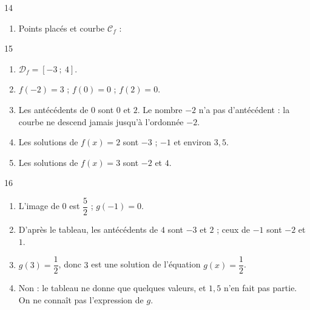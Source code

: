 \documentclass[10pt,a4paper]{article}
\begin{document}
\begin{corr}[Guidé]{14}
\begin{enumerate}[leftmargin=*]
    \(\begin{aligned}[t] f\left(-\dfrac{1}{2}\right)&=\left(-\dfrac{1}{2}\right)^2-2\times\left(-\dfrac{1}{2}\right)-1\\ &=\dfrac{1}{4}+1-1\\ &=\dfrac{1}{4}\end{aligned}\)
    \item Points placés et courbe \(\mathcal{C}_f\) :
    \begin{center}
    \end{center}
\end{enumerate}
\end{corr}

\begin{corr}{15}
\begin{enumerate}[leftmargin=*]
    \item \(\mathcal{D}_f=[-3\ ;\ 4]\).
    \item \(f(-2)=3\) ; \(f(0)=0\) ; \(f(2)=0\).
    \item Les antécédents de \(0\) sont \(0\) et \(2\). Le nombre \(-2\) n'a pas d'antécédent : la courbe ne descend jamais jusqu'à l'ordonnée \(-2\).
    \item Les solutions de \(f(x)=2\) sont \(-3\) ; \(-1\) et environ \(3,5\).
    \item Les solutions de \(f(x)=3\) sont \(-2\) et \(4\).
\end{enumerate}
\end{corr}

\begin{corr}{16}
\begin{enumerate}[leftmargin=*]
    \item L'image de \(0\) est \(\dfrac{5}{2}\) ; \(g(-1)=0\).
    \item D'après le tableau, les antécédents de \(4\) sont \(-3\) et \(2\) ; ceux de \(-1\) sont \(-2\) et \(1\).
    \item \(g(3)=\dfrac{1}{2}\), donc \(3\) est une solution de l'équation \(g(x)=\dfrac{1}{2}\).
    \item Non : le tableau ne donne que quelques valeurs, et \(1,5\) n'en fait pas partie. On ne connaît pas l'expression de \(g\).
\end{enumerate}
\end{corr}
\end{document}
